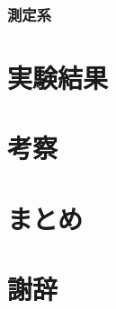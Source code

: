\documentclass[dvipdfmx]{jsreport}
\numberwithin{equation}{chapter}
\numberwithin{table}{chapter}
\begin{document}
\subsection{測定系}
\chapter{実験結果}
\chapter{考察}
\chapter{まとめ}
\chapter{謝辞}




\nocite{st,Peskin,spin_oxford,alma9926360528004034,alma990023076750204034,alma990023937250204034,ku}
\end{document}
